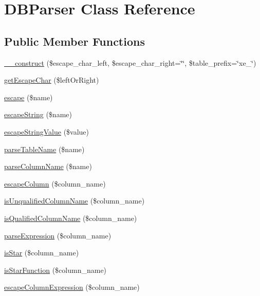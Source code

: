 \hypertarget{classDBParser}{\section{D\-B\-Parser Class Reference}
\label{classDBParser}
}
\subsection*{Public Member Functions}
\begin{DoxyCompactItemize}
\item 
\hyperlink{classDBParser_a6586abb3aafc1097d2e5c43db7858c45}{\-\_\-\-\_\-construct} (\$escape\-\_\-char\-\_\-left, \$escape\-\_\-char\-\_\-right=\char`\"{}\char`\"{}, \$table\-\_\-prefix=\char`\"{}xe\-\_\-\char`\"{})
\item 
\hyperlink{classDBParser_aed9e06c08955d267a0576b178f37d6ee}{get\-Escape\-Char} (\$left\-Or\-Right)
\item 
\hyperlink{classDBParser_ac2807a8b1ef18ebf574078e60e1754c6}{escape} (\$name)
\item 
\hyperlink{classDBParser_acf60e21d6407197af743d97bc9158325}{escape\-String} (\$name)
\item 
\hyperlink{classDBParser_ac4a2f15f2cc6c4f0edf848cfc0005259}{escape\-String\-Value} (\$value)
\item 
\hyperlink{classDBParser_ac4d949f99739a604bd7ee1ca7f14c946}{parse\-Table\-Name} (\$name)
\item 
\hyperlink{classDBParser_a4e9d7229c290a48fddd26c278f964dab}{parse\-Column\-Name} (\$name)
\item 
\hyperlink{classDBParser_a21799d785eb817b6df7871b895c91185}{escape\-Column} (\$column\-\_\-name)
\item 
\hyperlink{classDBParser_a049f95bd692b0d34a72f88f92091af6f}{is\-Unqualified\-Column\-Name} (\$column\-\_\-name)
\item 
\hyperlink{classDBParser_a927c668f7d1b2994743f9bdf6530ba58}{is\-Qualified\-Column\-Name} (\$column\-\_\-name)
\item 
\hyperlink{classDBParser_a44e806ac029512b9d54b2f44a0a6385f}{parse\-Expression} (\$column\-\_\-name)
\item 
\hyperlink{classDBParser_a73f99ee88bbe7c6bc871a67de4efa2b1}{is\-Star} (\$column\-\_\-name)
\item 
\hyperlink{classDBParser_a6a13c1cc9497af7dd0cb48e07b852947}{is\-Star\-Function} (\$column\-\_\-name)
\item 
\hyperlink{classDBParser_a98416a358e6b2647d03d967b28a11504}{escape\-Column\-Expression} (\$column\-\_\-name)
\end{DoxyCompactItemize}

